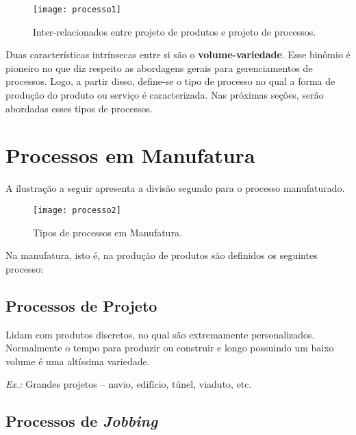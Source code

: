 		\begin{figure}[h]
			\centering
			\texttt{[image: processo1]}
			\caption[Inter-relacionados entre projeto de produtos e projeto de processos]{Inter-relacionados entre projeto de produtos e projeto de processos.}
			\label{fig:processo1}
		\end{figure}

		Duas características intrínsecas entre si são o \textbf{volume-variedade}. Esse binômio é pioneiro no que diz respeito as abordagens gerais para gerenciamentos de processos. Logo, a partir disso, define-se o tipo de processo no qual a forma de produção do produto ou serviço é caracterizada. Nas próximas seções, serão abordadas esses tipos de processos.

		\section[Processos em Manufatura]{Processos em Manufatura}
		\label{sec:processos_manufatura}
			
			A ilustração a seguir apresenta a divisão segundo \cite{slack} para o processo manufaturado.

			\begin{figure}[h]
				\centering
				\texttt{[image: processo2]}
				\caption[Tipos de processos em Manufatura]{Tipos de processos em Manufatura.}
				\label{fig:processo2}
			\end{figure}

			Na manufatura, isto é, na produção de produtos são definidos os seguintes processo:

			\subsection[Processos de Projeto]{Processos de Projeto}
			\label{sec:processos_manufatura_projeto}

				Lidam com produtos discretos, no qual são extremamente personalizados. Normalmente o tempo para produzir ou construir e longo possuindo um baixo volume é uma altíssima variedade.
				
				\emph{Ex.:} Grandes projetos – navio, edifício, túnel, viaduto, etc.

			\subsection[Processos de Jobbing]{Processos de \emph{Jobbing}}
			\label{sec:processos_manufatura_jobbing}


